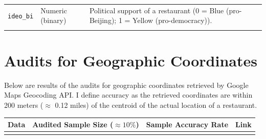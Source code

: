 \documentclass[letterpaper, 12pt]{article}
\begin{document}
\begin{appendices}
\begin{table}[h!]
\begin{tabularx}{\textwidth}{CCC}
\texttt{ideo\_bi} & Numeric (binary) & Political support of a restaurant (0 = Blue (pro-Beijing); 1 = Yellow (pro-democracy)).  \\
{} &  &   \\
\bottomrule
\end{tabularx}
\end{table}



\pagebreak
\clearpage
\section{Audits for Geographic Coordinates} \label{appendix:audits}
Below are results of the audits for geographic coordinates retrieved by Google Maps Geocoding API. I define accuracy as the retrieved coordinates are within 200 meters ($\approx$ 0.12 miles) of the centroid of the actual location of a restaurant. \\
\begin{table}[h!]
\setlength\extrarowheight{2pt} %
\begin{tabularx}{\textwidth}{CCCC}
\toprule
\textbf{Data} & \textbf{Audited Sample Size ($\approx 10\%$)} & \textbf{Sample Accuracy Rate} & \textbf{Link}  \\
\midrule
{} &    &  & \\
\bottomrule
\end{tabularx}
\end{table}









\end{appendices}
\end{document}

